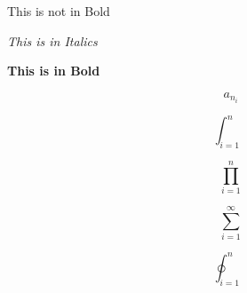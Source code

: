 \documentclass{article}
\begin{document}
This is not in Bold

\textit{This is in Italics}

\textbf{This is in Bold}

\[ a_{n_i} \]

\[ \int_{i=1}^n \]

\[ \prod_{i=1}^n \]

\[ \sum_{i=1}^{\infty} \]

\[ \oint_{i=1}^n \]
\end{document}
